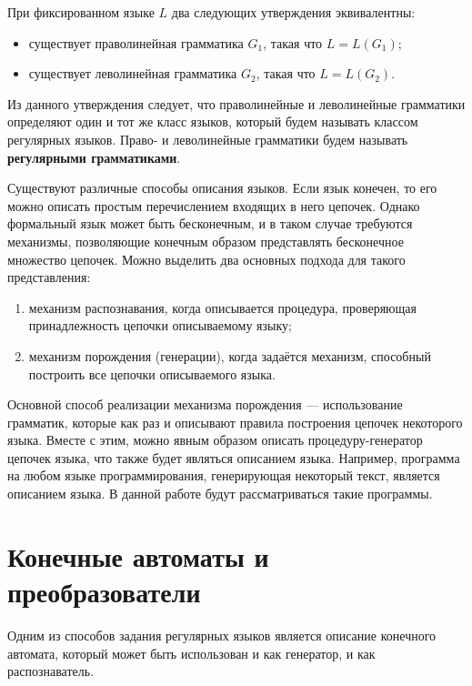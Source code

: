 При фиксированном языке $L$ два следующих утверждения эквивалентны: 
\begin{itemize}
    \item существует праволинейная грамматика $G_1$, такая что $L = L(G_1)$; 
    \item существует леволинейная грамматика $G_2$, такая что $L = L(G_2)$.
\end{itemize}

Из данного утверждения следует, что праволинейные и леволинейные грамматики определяют один и тот же класс языков, который будем называть классом регулярных языков. Право- и леволинейные грамматики будем называть \textbf{регулярными грамматиками}. 

    Существуют различные способы описания языков. Если язык конечен, то его можно описать  простым перечислением входящих в него цепочек. Однако формальный язык может быть бесконечным, и в таком случае требуются механизмы, позволяющие конечным образом представлять бесконечное множество цепочек. Можно выделить два основных подхода для такого представления:
\begin{enumerate}
    \item механизм распознавания, когда описывается процедура, проверяющая принадлежность цепочки описываемому языку;
    \item механизм порождения (генерации), когда задаётся механизм, способный построить все цепочки описываемого языка.
\end{enumerate}

     Основной способ реализации механизма порождения --- использование грамматик, которые как раз и описывают правила построения цепочек некоторого языка. Вместе с этим, можно явным образом описать процедуру-генератор цепочек языка, что также будет являться описанием языка. Например, программа на любом языке программирования, генерирующая некоторый текст, является описанием языка. В данной работе будут рассматриваться такие программы.


\section{Конечные автоматы и преобразователи}

Одним из способов задания регулярных языков является описание конечного автомата, который может быть использован и как генератор, и как распознаватель.


